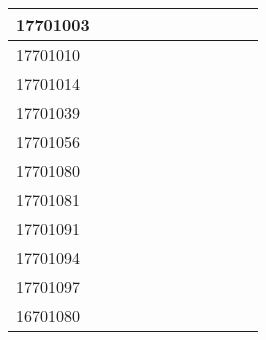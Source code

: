 \documentclass[12pt]{article}
\begin{document}
\begin{center}
\begin{small}
\begin{tabular}{|l|c|c|c|c|c|c|c|c|c|c|}
17701003 &  &  &  &  &  &  &  &  & \\ \hline 
17701010 &  &  &  &  &  &  &  &  & \\ \hline 
17701014 &  &  &  &  &  &  &  &  & \\ \hline 
17701039 &  &  &  &  &  &  &  &  & \\ \hline 
17701056 &  &  &  &  &  &  &  &  & \\ \hline 
17701080 &  &  &  &  &  &  &  &  & \\ \hline 
17701081 &  &  &  &  &  &  &  &  & \\ \hline 
17701091 &  &  &  &  &  &  &  &  & \\ \hline 
17701094 &  &  &  &  &  &  &  &  & \\ \hline 
17701097 &  &  &  &  &  &  &  &  & \\ \hline 
16701080 &  &  &  &  &  &  &  &  & \\ \hline 
        \end{tabular}
            \end{small}
            \end{center}
  \centering
            
\end{document}
